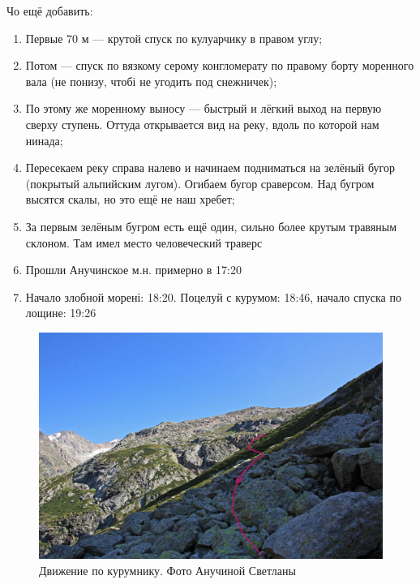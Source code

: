 Чо ещё добавить: 
\begin{enumerate} 
	\item Первые 70 м — крутой спуск по кулуарчику в правом углу; 
	\item Потом — спуск по вязкому серому конгломерату по правому борту моренного вала (не понизу, чтобі не угодить под снежничек); 
	\item По этому же моренному выносу — быстрый и лёгкий выход на первую сверху ступень. Оттуда открывается вид на реку, вдоль по которой нам нинада; 
	\item Пересекаем реку справа налево и начинаем подниматься на зелёный бугор (покрытый альпийским лугом). Огибаем бугор сраверсом. Над бугром высятся скалы, но это ещё не наш хребет; 
	\item  За первым зелёным бугром есть ещё один, сильно более крутым травяным склоном. Там имел место человеческий траверс\texttrademark
	\item Прошли Анучинское м.н. примерно в 17:20
	\item Начало злобной морені: 18:20. Поцелуй с курумом: 18:46, начало спуска по лощине: 19:26
\end{enumerate}

\begin{figure}[h!]
	\centering
	\includegraphics[width=0.7\linewidth]{../pics/peremkurum.png}
	\caption{Движение по курумнику. Фото Анучиной Светланы}
	\label{perem_down}
\end{figure} 

